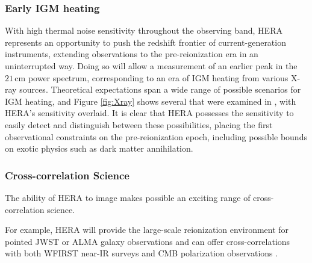 \documentclass[preprint]{aastex}
\begin{document}
\subsubsection{Early IGM heating}

With high thermal noise sensitivity throughout the observing band, HERA represents an opportunity to push the redshift frontier of current-generation instruments, extending observations to the pre-reionization era in an uninterrupted way.  Doing so will allow a measurement of an earlier peak in the $21\,\textrm{cm}$ power spectrum, corresponding to an era of IGM heating from various X-ray sources.  Theoretical expectations span a wide range of possible scenarios for IGM heating, and Figure \ref{fig:Xray} shows several that were examined in \cite{mesinger_et_al2013}, with HERA's sensitivity overlaid.  It is clear that HERA possesses the sensitivity to easily detect and distinguish between these possibilities, placing the first observational constraints on the pre-reionization epoch, including possible bounds on exotic physics such as dark matter annihilation.



\subsubsection{Cross-correlation Science}

The ability of HERA to image makes possible an exciting range of cross-correlation science.  

For example, HERA will provide the large-scale reionization environment for pointed JWST or ALMA 
galaxy observations and can offer cross-correlations with both WFIRST near-IR surveys \citep{lidz_et_al2009} 
and CMB polarization observations \citep{tashiro_et_al2010}.
\end{document}
